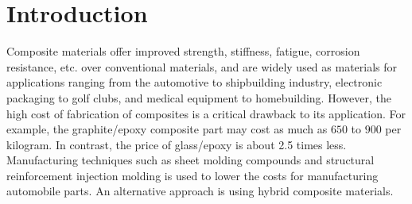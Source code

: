 \documentclass[Afour,sagev,times]{sagej}
\begin{document}
\section{Introduction}
Composite materials offer improved strength, stiffness, fatigue, corrosion resistance, etc. over
conventional materials, and are widely used as materials for applications ranging from the automotive to shipbuilding
industry, electronic packaging to golf clubs, and medical equipment to homebuilding. However, the high
cost of fabrication of composites is a critical drawback to its application. For example, the
graphite/epoxy composite part may cost as much as $650$ to $900$ per kilogram. In contrast, the price
of glass/epoxy is about 2.5 times less. Manufacturing techniques such as sheet molding compounds and
structural reinforcement injection molding is used to lower the  costs for manufacturing automobile parts.
An alternative approach is using hybrid composite materials.
\end{document}
